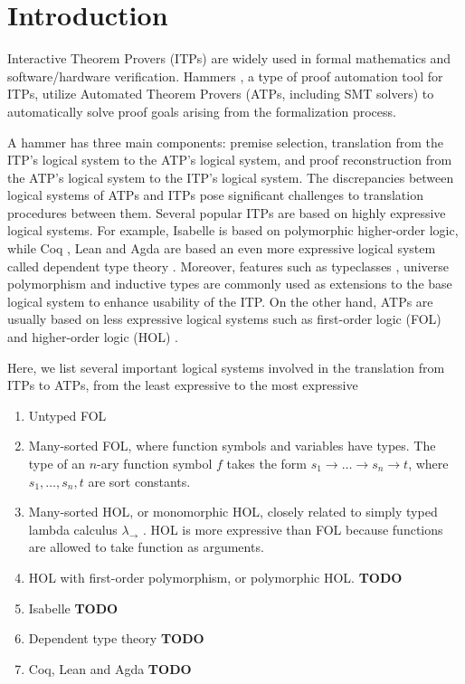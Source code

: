 \section{Introduction}

  Interactive Theorem Provers (ITPs) \cite{Harrison2014HistoryOI}
  are widely used in formal mathematics and software/hardware verification. Hammers
  \cite{Blanchette2016HammeringTQ}\cite{Czajka2018HammerFC}, a type of proof automation tool for
  ITPs, utilize Automated Theorem Provers (ATPs, including SMT solvers) to automatically solve proof goals
  arising from the formalization process.  
  
  A hammer has three main components:
  premise selection, translation from the ITP's logical system to the ATP's
  logical system, and proof reconstruction from the ATP's logical system to
  the ITP's logical system. The discrepancies between logical systems of ATPs and ITPs pose
  significant challenges to translation procedures between them.
  Several popular ITPs are based on highly expressive logical systems.
  For example, Isabelle \cite{Isabelle} is based on polymorphic higher-order logic, while
  Coq \cite{CoqRefMan}, Lean \cite{Lean4} and Agda \cite{Agda}
  are based an even more expressive logical system called dependent type theory \cite{LambdaWithType}\cite{Coquand1988}.
  Moreover, features such as typeclasses \cite{TypeClassHaskell}, universe polymorphism \cite{UPolyCoq} and inductive types \cite{CICIndDef}
  are commonly used as extensions to the base logical system to enhance usability of the ITP.
  On the other hand, ATPs are usually based on less expressive logical systems such
  as first-order logic (FOL) \cite{CVC5}\cite{Vampire}\cite{Z3Paper}\cite{EProver} and
  higher-order logic (HOL) \cite{HOVampire}\cite{ZipperpositionMakeWork}\cite{HOEProver}.

  Here, we list several important logical systems involved in the translation from
  ITPs to ATPs, from the least expressive to the most expressive
  \begin{enumerate}
    \item Untyped FOL
    \item Many-sorted FOL, where function symbols and variables have types. The type
      of an $n$-ary function symbol $f$ takes the form $s_1 \to \dots \to s_n \to t$,
      where $s_1, \dots, s_n, t$ are sort constants.
    \item Many-sorted HOL, or monomorphic HOL, closely related to simply typed lambda calculus
      $\lambda_\to$ \cite{LambdaWithType}. HOL is more expressive than FOL because
      functions are allowed to take function as arguments.
    \item HOL with first-order polymorphism, or polymorphic HOL. \textbf{TODO}
    \item Isabelle \textbf{TODO}
    \item Dependent type theory \textbf{TODO}
    \item Coq, Lean and Agda \textbf{TODO}
  \end{enumerate}

